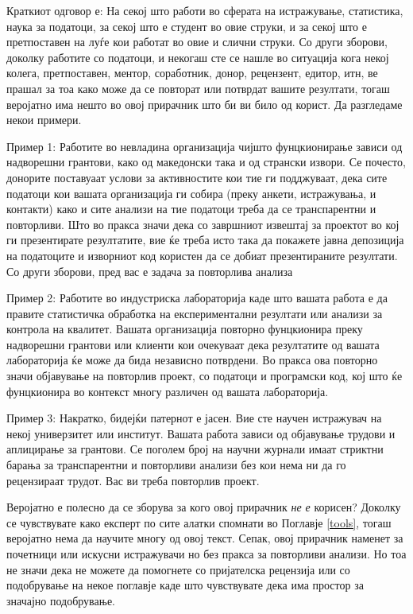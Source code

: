 \documentclass[
]{book}
\begin{document}
Краткиот одговор е: На секој што работи во сферата на истражување, статистика, наука за податоци, за секој што е студент во овие струки, и за секој што е претпоставен на луѓе кои работат во овие и слични струки. Со други зборови, доколку работите со податоци, и некогаш сте се нашле во ситуација кога некој колега, претпоставен, ментор, соработник, донор, рецензент, едитор, итн, ве прашал за тоа како може да се повторат или потврдат вашите резултати, тогаш веројатно има нешто во овој прирачник што би ви било од корист. Да разгледаме некои примери.

Пример 1: Работите во невладина организација чијшто фунцкионирање зависи од надворешни грантови, како од македонски така и од странски извори. Се почесто, донорите поставуаат услови за активностите кои тие ги подджуваат, дека сите податоци кои вашата организација ги собира (преку анкети, истражувања, и контакти) како и сите анализи на тие податоци треба да се транспарентни и повторливи. Што во пракса значи дека со завршниот извештај за проектот во кој ги презентирате резултатите, вие ќе треба исто така да покажете јавна депозиција на податоците и изворниот код користен да се добиат презентираните резултати. Со други зборови, пред вас е задача за повторлива анализа

Пример 2: Работите во индустриска лабораторија каде што вашата работа е да правите статистичка обработка на експериментални резултати или анализи за контрола на квалитет. Вашата организација повторно фунцкионира преку надворешни грантови или клиенти кои очекуваат дека резултатите од вашата лабораторија ќе може да бида независно потврдени. Во пракса ова повторно значи објавување на повторлив проект, со податоци и програмски код, кој што ќе фунцкионира во контекст многу различен од вашата лабораторија.

Пример 3: Накратко, бидејќи патернот е јасен. Вие сте научен истражувач на некој универзитет или институт. Вашата работа зависи од објавување трудови и аплицирање за грантови. Се поголем број на научни журнали имаат стриктни барања за транспарентни и повторливи анализи без кои нема ни да го рецензираат трудот. Вас ви треба повторлив проект.

Веројатно е полесно да се зборува за кого овој прирачник \emph{не е} корисен? Доколку се чувствувате како експерт по сите алатки спомнати во Поглавје \ref{tools}, тогаш веројатно нема да научите многу од овој текст. Сепак, овој прирачник наменет за почетници или искусни истражувачи но без пракса за повторливи анализи. Но тоа не значи дека не можете да помогнете со пријателска рецензија или со подобрување на некое поглавје каде што чувствувате дека има простор за значајно подобрување.
\end{document}
